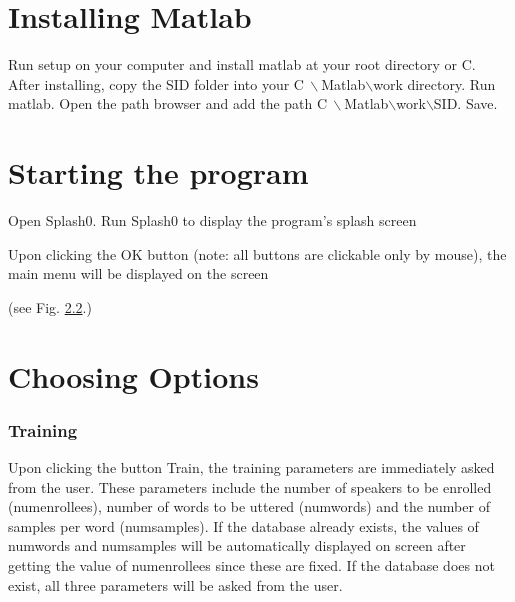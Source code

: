 \chapter{Installing Matlab}
    Run setup on your computer and install matlab at your root
    directory or C.
    After installing, copy the SID folder into your C$\: \backslash$Matlab$\backslash$work
    directory.
    Run matlab.
    Open the path browser and add the path C$\: \backslash$Matlab$\backslash$work$\backslash$SID.
    Save.

\chapter{Starting the program}

    Open Splash0.
    Run Splash0 to display the program's splash screen

    \begin{figure}[h]
    \begin{center}
     \caption{\label{splash_fig}}
    \end{center}
    \end{figure}

    Upon clicking the OK button (note: all buttons are clickable only by
    mouse), the main menu will be displayed on the screen

    \begin{figure}[h]
    \begin{center}
     \caption{\label{mainmenu_fig}}
    \end{center}
    \end{figure}

    (see Fig. \ref{mainmenu_fig}.)

\chapter{Choosing Options}

\subsection{Training}
    Upon clicking the button Train, the training parameters are
    immediately asked from the user. These parameters include the
    number of speakers to be enrolled (numenrollees), number of
    words to be uttered (numwords) and the number of samples per
    word (numsamples). If the database already exists, the values
    of numwords and numsamples will be automatically displayed on
    screen after getting the value of numenrollees since these are
    fixed. If the database does not exist, all three parameters will be
    asked from the user.


